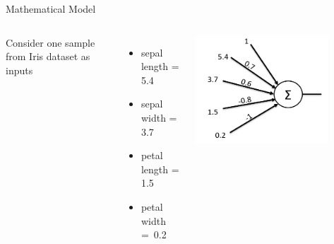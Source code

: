 \documentclass[aspectratio=169,14pt,usenames,dvipsnames]{beamer}
\begin{document}
\begin{frame}{Mathematical Model}
\begin{columns}
\item Consider one sample from Iris dataset as inputs
	\begin{itemize}
	  \item sepal length = 5.4\\
	  \item sepal width  = 3.7\\
	  \item petal length = 1.5\\
	  \item petal width = 0.2
  
\end{itemize}
\includegraphics[width=0.8\textwidth, height=0.6\textheight]{Images/AIML_Percep_IMG7.png}
\end{columns}
\end{frame}
\end{document}
